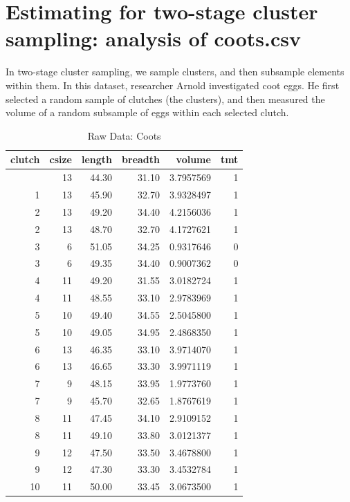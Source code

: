 \documentclass[
  letterpaper,
  DIV=11,
  numbers=noendperiod]{scrreprt}
\renewcommand{\[}{\begin{equation}}
\renewcommand{\]}{\end{equation}}
\begin{document}
\section{Estimating for two-stage cluster sampling: analysis of
coots.csv}\label{estimating-for-two-stage-cluster-sampling-analysis-of-coots.csv}

In two-stage cluster sampling, we sample clusters, and then subsample
elements within them. In this dataset, researcher Arnold investigated
coot eggs. He first selected a random sample of clutches (the clusters),
and then measured the volume of a random subsample of eggs within each
selected clutch.

\begin{table}
\caption*{
{\fontsize{20}{25}\selectfont  Raw Data: Coots\fontsize{12}{15}\selectfont }
} 
\fontsize{12.0pt}{14.0pt}\selectfont
\begin{tabular*}{\linewidth}{@{\extracolsep{\fill}}rrrrrr}
\toprule
clutch & csize & length & breadth & volume & tmt \\ 
\midrule\addlinespace[2.5pt]
1 & 13 & 44.30 & 31.10 & 3.7957569 & 1 \\ 
1 & 13 & 45.90 & 32.70 & 3.9328497 & 1 \\ 
2 & 13 & 49.20 & 34.40 & 4.2156036 & 1 \\ 
2 & 13 & 48.70 & 32.70 & 4.1727621 & 1 \\ 
3 & 6 & 51.05 & 34.25 & 0.9317646 & 0 \\ 
3 & 6 & 49.35 & 34.40 & 0.9007362 & 0 \\ 
4 & 11 & 49.20 & 31.55 & 3.0182724 & 1 \\ 
4 & 11 & 48.55 & 33.10 & 2.9783969 & 1 \\ 
5 & 10 & 49.40 & 34.55 & 2.5045800 & 1 \\ 
5 & 10 & 49.05 & 34.95 & 2.4868350 & 1 \\ 
6 & 13 & 46.35 & 33.10 & 3.9714070 & 1 \\ 
6 & 13 & 46.65 & 33.30 & 3.9971119 & 1 \\ 
7 & 9 & 48.15 & 33.95 & 1.9773760 & 1 \\ 
7 & 9 & 45.70 & 32.65 & 1.8767619 & 1 \\ 
8 & 11 & 47.45 & 34.10 & 2.9109152 & 1 \\ 
8 & 11 & 49.10 & 33.80 & 3.0121377 & 1 \\ 
9 & 12 & 47.50 & 33.50 & 3.4678800 & 1 \\ 
9 & 12 & 47.30 & 33.30 & 3.4532784 & 1 \\ 
10 & 11 & 50.00 & 33.45 & 3.0673500 & 1 \\ 

\end{tabular*}
\end{table}
\end{document}
